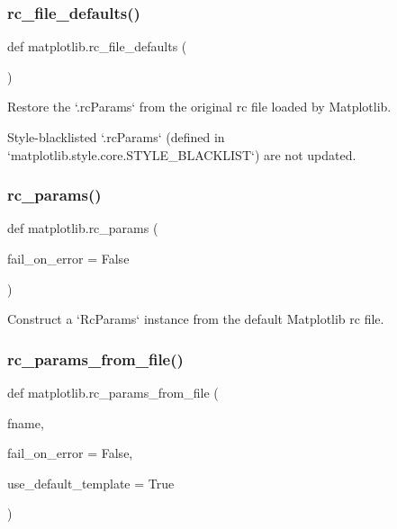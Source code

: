 \subsubsection{\texorpdfstring{rc\+\_\+file\+\_\+defaults()}{rc\_file\_defaults()}}
{\footnotesize\ttfamily def matplotlib.\+rc\+\_\+file\+\_\+defaults (\begin{DoxyParamCaption}{ }\end{DoxyParamCaption})}

\begin{DoxyVerb}Restore the `.rcParams` from the original rc file loaded by Matplotlib.

Style-blacklisted `.rcParams` (defined in
`matplotlib.style.core.STYLE_BLACKLIST`) are not updated.
\end{DoxyVerb}
 \mbox{\label{namespacematplotlib_af635acac141b4caa451dd53c94109c07}} 
\subsubsection{\texorpdfstring{rc\+\_\+params()}{rc\_params()}}
{\footnotesize\ttfamily def matplotlib.\+rc\+\_\+params (\begin{DoxyParamCaption}\item[{}]{fail\+\_\+on\+\_\+error = {\ttfamily False} }\end{DoxyParamCaption})}

\begin{DoxyVerb}Construct a `RcParams` instance from the default Matplotlib rc file.\end{DoxyVerb}
 \mbox{\label{namespacematplotlib_abeb932db9ebc701d700b548f24f47809}} 
\subsubsection{\texorpdfstring{rc\+\_\+params\+\_\+from\+\_\+file()}{rc\_params\_from\_file()}}
{\footnotesize\ttfamily def matplotlib.\+rc\+\_\+params\+\_\+from\+\_\+file (\begin{DoxyParamCaption}\item[{}]{fname,  }\item[{}]{fail\+\_\+on\+\_\+error = {\ttfamily False},  }\item[{}]{use\+\_\+default\+\_\+template = {\ttfamily True} }\end{DoxyParamCaption})}

